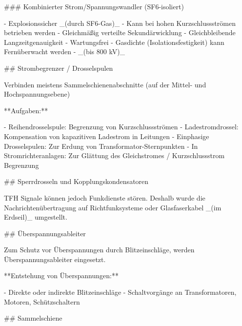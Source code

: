 \begin{markdown}
\newpage

### Kombinierter Strom/Spannungswandler (SF6-isoliert)

- Explosionssicher _(durch SF6-Gas)_
- Kann bei hohen Kurzschlussströmen betrieben werden
- Gleichmäßig verteilte Sekundärwicklung
- Gleichbleibende Langzeitgenauigkeit
- Wartungsfrei
- Gasdichte (Isolationsfestigkeit) kann Fernüberwacht werden
- _(bis 800 kV)_

## Strombegrenzer / Drosselspulen


Verbinden meistens Sammelschienenabschnitte (auf der Mittel- und Hochspannungsebene)

**Aufgaben:**

- Reihendrosselspule: Begrenzung von Kurzschlussströmen
- Ladestromdrossel: Kompensation von kapazitiven Ladestrom in Leitungen
- Einphasige Drosselspulen: Zur Erdung von Transformator-Sternpunkten
- In Stromrichteranlagen: Zur Glättung des Gleichstromes / Kurzschlussstrom Begrenzung


## Sperrdrosseln und Kopplungskondensatoren


TFH Signale können jedoch Funkdienste stören. Deshalb wurde die Nachrichtenübertragung auf Richtfunksysteme oder Glasfaserkabel _(im Erdseil)_ umgestellt.

## Überspannungsableiter

Zum Schutz vor Überspannungen durch Blitzeinschläge, werden Überspannungsableiter eingesetzt.


**Entstehung von Überspannungen:**

- Direkte oder indirekte Blitzeinschläge
- Schaltvorgänge an Transformatoren, Motoren, Schützschaltern

## Sammelschiene



\end{markdown}
